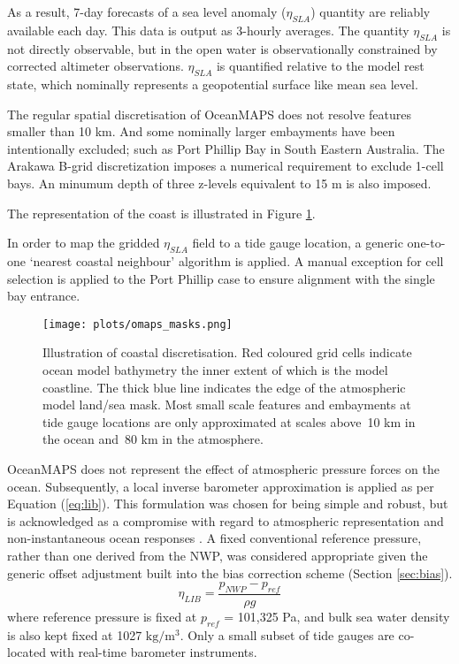 As a result, 7-day forecasts of a sea level anomaly ($\eta_{SLA}$) quantity are reliably available each day.  
This data is output as 3-hourly averages.  
The quantity $\eta_{SLA}$ is not directly observable, but in the open water is observationally constrained by corrected altimeter observations.
$\eta_{SLA}$ is quantified relative to the model rest state, which nominally represents a geopotential surface like mean sea level.  

The regular spatial discretisation of OceanMAPS does not resolve features smaller than 10 km.   
And some nominally larger embayments have been intentionally excluded; such as Port Phillip Bay in South Eastern Australia.
The Arakawa B-grid discretization imposes a numerical requirement to exclude 1-cell bays. 
An minumum depth of three z-levels equivalent to 15 m is also imposed.

The representation of the coast is illustrated in Figure \ref{fig:map_masks}.

In order to map the gridded $\eta_{SLA}$ field to a tide gauge location, a generic one-to-one `nearest coastal neighbour' algorithm is applied.
A manual exception for cell selection is applied to the Port Phillip case to ensure alignment with the single bay entrance. 
\vspace{6pt}
\begin{figure}[H]
    \centering
    \texttt{[image: plots/omaps\_masks.png]}
    \caption{Illustration of coastal discretisation.  Red coloured grid cells indicate ocean model bathymetry the inner extent of which is the model coastline.  The thick blue line indicates the edge of the atmospheric model land/sea mask.  Most small scale features and embayments at tide gauge locations are only approximated at scales above~10 km in the ocean and~80 km in the atmosphere. }
    \label{fig:map_masks}
\end{figure}  


OceanMAPS does not represent the effect of atmospheric pressure forces on the ocean.
Subsequently, a local inverse barometer approximation is applied as per Equation (\ref{eq:lib}).
This formulation was chosen for being simple and robust, but is acknowledged as a compromise with regard to atmospheric representation and non-instantaneous ocean responses \cite{Mathers:2004bk}.
A fixed conventional reference pressure, rather than one derived from the NWP, was considered appropriate given the generic offset adjustment built into the bias correction scheme (Section \ref{sec:bias}).  
\begin{equation}
  \eta_{LIB} = \frac{ p_{NWP} - p_{ref} }{ \rho g }
  \label{eq:lib}
\end{equation}
where reference pressure is fixed at $p_{ref}$ = 101,325 Pa, and bulk sea water density is also kept fixed at 1027 $\text{kg}/\text{m}^3$.
Only a small subset of tide gauges are co-located with real-time barometer instruments.


